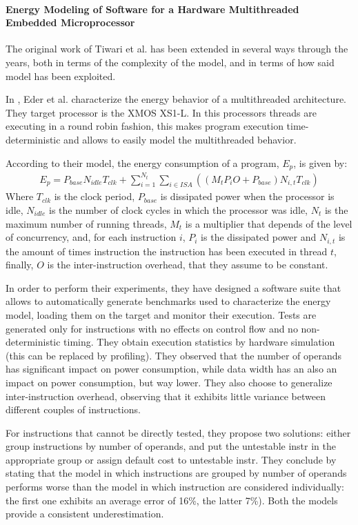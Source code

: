 \paragraph{Energy Modeling of Software for a Hardware Multithreaded Embedded Microprocessor}
The original work of Tiwari et al. has been extended in several ways through the years, both in terms of the complexity of the model, and in terms of how said model has been exploited. \par
In \cite{xmos}, Eder et al. characterize the energy behavior of a multithreaded architecture. They target processor is the XMOS XS1-L. In this processors threads are executing in a round robin fashion, this makes program execution time-deterministic and allows to easily model the multithreaded behavior. \par 
According to their model, the energy consumption of a program, $E_{p}$, is given by:
\begin{gather*} 
E_{p} = P_{base}N_{idle}T_{clk} + \sum_{i=1}^{N_{t}} \sum_{i \in ISA}((M_{t}P_{i}O + P_{base})N_{i,t}T_{clk})
\end{gather*}
Where $T_{clk}$ is the clock period, $P_{base}$ is dissipated power when the processor is idle, $N_{idle}$ is the number of clock cycles in which the processor was idle, $N_{t}$ is the maximum number of running threads, $M_{t}$ is a multiplier that depends of the level of concurrency, and, for each instruction $i$, $P_{i}$ is the dissipated power and $N_{i,t}$ is the amount of times instruction the instruction has been executed in thread $t$, finally, $O$ is the inter-instruction overhead, that they assume to be constant. \par 
In order to perform their experiments, they have designed a software suite that allows to automatically generate benchmarks used to characterize the energy model, loading them on the target and monitor their execution. Tests are generated only for instructions with no effects on control flow and no non-deterministic timing. They obtain execution statistics by hardware simulation (this can be replaced by profiling).
They observed that the number of operands has significant impact on power consumption, while data width has an also an impact on power consumption, but way lower. They also choose to generalize inter-instruction overhead, observing that it exhibits little variance between different couples of instructions. \par 
For instructions that cannot be directly tested, they propose two solutions: either group instructions by number of operands, and put the untestable instr in the appropriate group or assign default cost to untestable instr. \newline
They conclude by stating that the model in which instructions are grouped by number of operands performs worse than the model in which instruction are considered individually: the first one exhibits an average error of 16\%, the latter 7\%). Both the models provide a consistent underestimation. 

